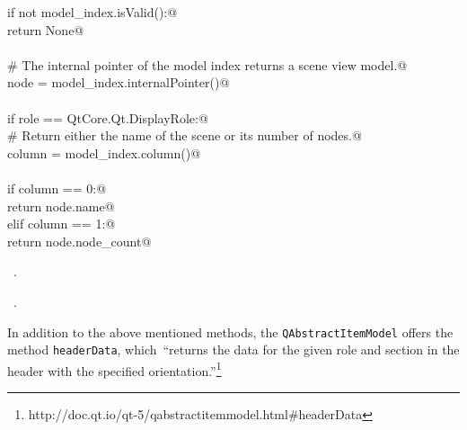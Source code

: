 \documentclass[
    a4paper,      %
    10pt,         %
    openright,    %
    notitlepage,  %
    parskip=half, %
]{scrreprt}       %
\theoremstyle{definition}                    %
\begin{document}
\begin{flushleft}
\begin{minipage}{\linewidth}
\begin{list}{}{}
\mbox{}\lstinline@    if not model_index.isValid():@\\
\mbox{}\lstinline@        return None@\\
\mbox{}\lstinline@@\\
\mbox{}\lstinline@    # The internal pointer of the model index returns a scene view model.@\\
\mbox{}\lstinline@    node = model_index.internalPointer()@\\
\mbox{}\lstinline@@\\
\mbox{}\lstinline@    if role == QtCore.Qt.DisplayRole:@\\
\mbox{}\lstinline@        # Return either the name of the scene or its number of nodes.@\\
\mbox{}\lstinline@        column = model_index.column()@\\
\mbox{}\lstinline@@\\
\mbox{}\lstinline@        if column == 0:@\\
\mbox{}\lstinline@            return node.name@\\
\mbox{}\lstinline@        elif column == 1:@\\
\mbox{}\lstinline@            return node.node_count@\\
\mbox{}\lstinline@@{\NWsep}
\end{list}
\vspace{-1.5ex}
\footnotesize
\begin{list}{}{\setlength{\itemsep}{-\parsep}\setlength{\itemindent}{-\leftmargin}}
\item \NWtxtMacroDefBy\ .
\item \NWtxtMacroRefIn\ .

\item{}
\end{list}
\end{minipage}\vspace{4ex}
\end{flushleft}
In addition to the above mentioned methods, the \verb+QAbstractItemModel+ offers
the method \verb+headerData+, which~\enquote{returns the data for the given role
and section in the header with the specified orientation.}\footnote{http://doc.qt.io/qt-5/qabstractitemmodel.html\#headerData}
\end{document}
